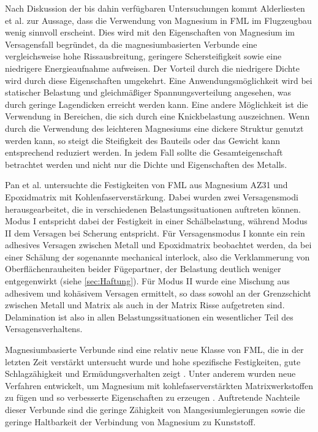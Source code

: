 Nach Diskussion der bis dahin verfügbaren Untersuchungen kommt Alderliesten et al. \cite{Alderliesten.2008} zur Aussage, dass die Verwendung von Magnesium in FML im Flugzeugbau wenig sinnvoll erscheint. Dies wird mit den Eigenschaften von Magnesium im Versagensfall begründet, da die magnesiumbasierten Verbunde eine vergleichsweise hohe Rissausbreitung, geringere Schersteifigkeit sowie eine niedrigere Energieaufnahme aufweisen. Der Vorteil durch die niedrigere Dichte wird durch diese Eigenschaften umgekehrt. Eine Anwendungsmöglichkeit wird bei statischer Belastung und gleichmäßiger Spannungsverteilung angesehen, was durch geringe Lagendicken erreicht werden kann.
Eine andere Möglichkeit ist die Verwendung in Bereichen, die sich durch eine Knickbelastung auszeichnen. Wenn durch die Verwendung des leichteren Magnesiums eine dickere Struktur genutzt werden kann, so steigt die Steifigkeit des Bauteils oder das Gewicht kann entsprechend reduziert werden. 
In jedem Fall sollte die Gesamteigenschaft betrachtet werden und nicht nur die Dichte und Eigenschaften des Metalls. \cite{Alderliesten.2008}

Pan et al. \cite{Pan.2016} untersuchte die Festigkeiten von FML aus Magnesium AZ31 und Epoxidmatrix mit Kohlenfaserverstärkung. Dabei wurden zwei Versagensmodi herausgearbeitet, die in verschiedenen Belastungssituationen auftreten können. Modus I entspricht dabei der Festigkeit in einer Schälbelastung, während Modus II dem Versagen bei Scherung entspricht. Für Versagensmodus I konnte ein rein adhesives Versagen zwischen Metall und Epoxidmatrix beobachtet werden, da bei einer Schälung der sogenannte mechanical interlock, also die Verklammerung von Oberflächenrauheiten beider Fügepartner, der Belastung deutlich weniger entgegenwirkt (siehe \autoref{sec:Haftung}). Für Modus II wurde eine Mischung aus adhesivem und kohäsivem Versagen ermittelt, so dass sowohl an der Grenzschicht zwischen Metall und Matrix als auch in der Matrix Risse aufgetreten sind. Delamination ist also in allen Belastungssituationen ein wesentlicher Teil des Versagensverhaltens. 

Magnesiumbasierte Verbunde sind eine relativ neue Klasse von FML, die in der letzten Zeit verstärkt untersucht wurde und hohe spezifische Festigkeiten, gute Schlagzähigkeit und Ermüdungsverhalten zeigt \cite{Cicco.2019}. Unter anderem wurden neue Verfahren entwickelt, um Magnesium mit kohlefaserverstärkten Matrixwerkstoffen zu fügen und so verbesserte Eigenschaften zu erzeugen \cite{Pan.2017}. Auftretende Nachteile dieser Verbunde sind die geringe Zähigkeit von Mangesiumlegierungen sowie die geringe Haltbarkeit der Verbindung von Magnesium zu Kunststoff. 

